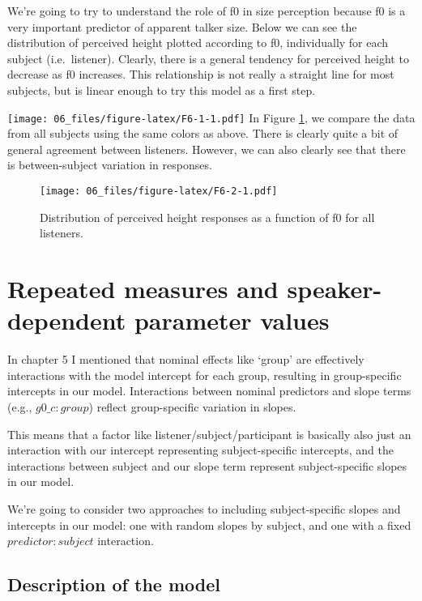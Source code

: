 \documentclass[
]{book}
\begin{document}
We're going to try to understand the role of f0 in size perception because f0 is a very important predictor of apparent talker size. Below we can see the distribution of perceived height plotted according to f0, individually for each subject (i.e.~listener). Clearly, there is a general tendency for perceived height to decrease as f0 increases. This relationship is not really a straight line for most subjects, but is linear enough to try this model as a first step.

\texttt{[image: 06\_files/figure-latex/F6-1-1.pdf]}
In Figure \ref{fig:F6-2}, we compare the data from all subjects using the same colors as above. There is clearly quite a bit of general agreement between listeners. However, we can also clearly see that there is between-subject variation in responses.

\begin{figure}
\centering
\texttt{[image: 06\_files/figure-latex/F6-2-1.pdf]}
\caption{\label{fig:F6-2}Distribution of perceived height responses as a function of f0 for all listeners.}
\end{figure}

\hypertarget{repeated-measures-and-speaker-dependent-parameter-values}{%
\section{Repeated measures and speaker-dependent parameter values}\label{repeated-measures-and-speaker-dependent-parameter-values}}

In chapter 5 I mentioned that nominal effects like `group' are effectively interactions with the model intercept for each group, resulting in group-specific intercepts in our model. Interactions between nominal predictors and slope terms (e.g., \(g0\_c \colon group\)) reflect group-specific variation in slopes.

This means that a factor like listener/subject/participant is basically also just an interaction with our intercept representing subject-specific intercepts, and the interactions between subject and our slope term represent subject-specific slopes in our model.

We're going to consider two approaches to including subject-specific slopes and intercepts in our model: one with random slopes by subject, and one with a fixed \(predictor \colon subject\) interaction.

\hypertarget{description-of-the-model-7}{%
\subsection{Description of the model}\label{description-of-the-model-7}}
\end{document}
